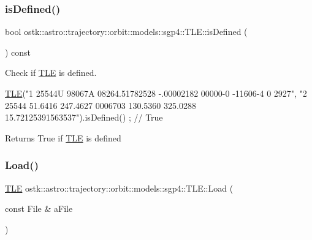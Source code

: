 \subsubsection{\texorpdfstring{is\+Defined()}{isDefined()}}
{\footnotesize\ttfamily bool ostk\+::astro\+::trajectory\+::orbit\+::models\+::sgp4\+::\+T\+L\+E\+::is\+Defined (\begin{DoxyParamCaption}{ }\end{DoxyParamCaption}) const}



Check if \hyperlink{classostk_1_1astro_1_1trajectory_1_1orbit_1_1models_1_1sgp4_1_1_t_l_e}{T\+LE} is defined. 


\begin{DoxyCode}
\hyperlink{classostk_1_1astro_1_1trajectory_1_1orbit_1_1models_1_1sgp4_1_1_t_l_e_a57323db2c24577c2e8ddce79fa776d1e}{TLE}(\textcolor{stringliteral}{"1 25544U 98067A   08264.51782528 -.00002182  00000-0 -11606-4 0  2927"},
    \textcolor{stringliteral}{"2 25544  51.6416 247.4627 0006703 130.5360 325.0288 15.72125391563537"}).isDefined() ; \textcolor{comment}{// True}
\end{DoxyCode}


\begin{DoxyReturn}{Returns}
True if \hyperlink{classostk_1_1astro_1_1trajectory_1_1orbit_1_1models_1_1sgp4_1_1_t_l_e}{T\+LE} is defined 
\end{DoxyReturn}
\mbox{\label{classostk_1_1astro_1_1trajectory_1_1orbit_1_1models_1_1sgp4_1_1_t_l_e_a5e912145266460d05beaba326b5ace95}} 
\subsubsection{\texorpdfstring{Load()}{Load()}}
{\footnotesize\ttfamily \hyperlink{classostk_1_1astro_1_1trajectory_1_1orbit_1_1models_1_1sgp4_1_1_t_l_e}{T\+LE} ostk\+::astro\+::trajectory\+::orbit\+::models\+::sgp4\+::\+T\+L\+E\+::\+Load (\begin{DoxyParamCaption}\item[{const File \&}]{a\+File }\end{DoxyParamCaption})\hspace{0.3cm}{\ttfamily [static]}}



